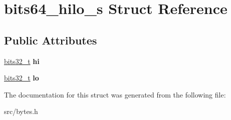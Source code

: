 \hypertarget{structbits64__hilo__s}{}\section{bits64\+\_\+hilo\+\_\+s Struct Reference}
\label{structbits64__hilo__s}
\subsection*{Public Attributes}
\begin{DoxyCompactItemize}
\item 
\hypertarget{structbits64__hilo__s_a0946ebf0589c70719d27a2e48483857b}{}\label{structbits64__hilo__s_a0946ebf0589c70719d27a2e48483857b} 
\hyperlink{unionbits32__t}{bits32\+\_\+t} {\bfseries hi}
\item 
\hypertarget{structbits64__hilo__s_a2aeab9be01dab5f21c7a461d25bd2ab1}{}\label{structbits64__hilo__s_a2aeab9be01dab5f21c7a461d25bd2ab1} 
\hyperlink{unionbits32__t}{bits32\+\_\+t} {\bfseries lo}
\end{DoxyCompactItemize}


The documentation for this struct was generated from the following file\+:\begin{DoxyCompactItemize}
\item 
src/bytes.\+h\end{DoxyCompactItemize}
